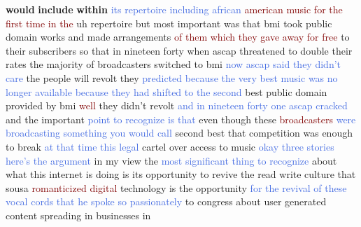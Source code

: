 \textbf{would} \textbf{include} \textbf{within} \textcolor{RoyalBlue}{its} \textcolor{RoyalBlue}{repertoire} \textcolor{RoyalBlue}{including} \textcolor{RoyalBlue}{african} \textcolor{Maroon}{american} \textcolor{Maroon}{music} \textcolor{Maroon}{for} \textcolor{Maroon}{the} \textcolor{Maroon}{first} \textcolor{Maroon}{time} \textcolor{Maroon}{in} \textcolor{Maroon}{the} uh repertoire but most important was that bmi took public domain works and made arrangements \textcolor{Maroon}{of} \textcolor{Maroon}{them} \textcolor{Maroon}{which} \textcolor{Maroon}{they} \textcolor{Maroon}{gave} \textcolor{Maroon}{away} \textcolor{Maroon}{for} \textcolor{Maroon}{free} to their subscribers so that in nineteen forty when ascap threatened to double their rates the majority of broadcasters switched to bmi \textcolor{RoyalBlue}{now} \textcolor{RoyalBlue}{ascap} \textcolor{RoyalBlue}{said} \textcolor{RoyalBlue}{they} \textcolor{RoyalBlue}{didn't} \textcolor{RoyalBlue}{care} the people will revolt they \textcolor{RoyalBlue}{predicted} \textcolor{RoyalBlue}{because} \textcolor{RoyalBlue}{the} \textcolor{RoyalBlue}{very} \textcolor{RoyalBlue}{best} \textcolor{RoyalBlue}{music} \textcolor{RoyalBlue}{was} \textcolor{RoyalBlue}{no} \textcolor{RoyalBlue}{longer} \textcolor{RoyalBlue}{available} \textcolor{RoyalBlue}{because} \textcolor{RoyalBlue}{they} \textcolor{RoyalBlue}{had} \textcolor{RoyalBlue}{shifted} \textcolor{RoyalBlue}{to} \textcolor{RoyalBlue}{the} \textcolor{RoyalBlue}{second} best public domain provided by bmi \textcolor{Maroon}{well} they didn't revolt \textcolor{RoyalBlue}{and} \textcolor{RoyalBlue}{in} \textcolor{RoyalBlue}{nineteen} \textcolor{RoyalBlue}{forty} \textcolor{RoyalBlue}{one} \textcolor{RoyalBlue}{ascap} \textcolor{RoyalBlue}{cracked} and the important \textcolor{RoyalBlue}{point} \textcolor{RoyalBlue}{to} \textcolor{RoyalBlue}{recognize} \textcolor{RoyalBlue}{is} \textcolor{RoyalBlue}{that} even though these \textcolor{Maroon}{broadcasters} \textcolor{RoyalBlue}{were} \textcolor{RoyalBlue}{broadcasting} \textcolor{RoyalBlue}{something} \textcolor{RoyalBlue}{you} \textcolor{RoyalBlue}{would} \textcolor{RoyalBlue}{call} second best that competition was enough to break \textcolor{RoyalBlue}{at} \textcolor{RoyalBlue}{that} \textcolor{RoyalBlue}{time} \textcolor{RoyalBlue}{this} \textcolor{RoyalBlue}{legal} cartel over access to music \textcolor{RoyalBlue}{okay} \textcolor{RoyalBlue}{three} \textcolor{RoyalBlue}{stories} \textcolor{RoyalBlue}{here's} \textcolor{RoyalBlue}{the} \textcolor{RoyalBlue}{argument} in my view the \textcolor{RoyalBlue}{most} \textcolor{RoyalBlue}{significant} \textcolor{RoyalBlue}{thing} \textcolor{RoyalBlue}{to} \textcolor{RoyalBlue}{recognize} about what this internet is doing is its opportunity to revive the read write culture that sousa \textcolor{Maroon}{romanticized} \textcolor{Maroon}{digital} technology is the opportunity \textcolor{RoyalBlue}{for} \textcolor{RoyalBlue}{the} \textcolor{RoyalBlue}{revival} \textcolor{RoyalBlue}{of} \textcolor{RoyalBlue}{these} \textcolor{RoyalBlue}{vocal} \textcolor{RoyalBlue}{cords} \textcolor{RoyalBlue}{that} \textcolor{RoyalBlue}{he} \textcolor{RoyalBlue}{spoke} \textcolor{RoyalBlue}{so} \textcolor{RoyalBlue}{passionately} to congress about user generated content spreading in businesses in 